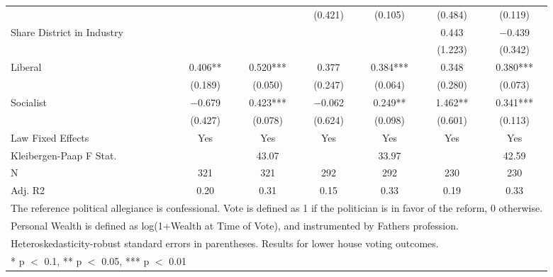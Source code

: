 \begin{table}[!h]
{\begin{tabular}[t]{lcccccc}
 &  &  & (\num{0.421}) & (\num{0.105}) & (\num{0.484}) & (\num{0.119})\\
Share District in Industry &  &  &  &  & \num{0.443} & \num{-0.439}\\
 &  &  &  &  & (\num{1.223}) & (\num{0.342})\\
Liberal & \num{0.406}** & \num{0.520}*** & \num{0.377} & \num{0.384}*** & \num{0.348} & \num{0.380}***\\
 & (\num{0.189}) & (\num{0.050}) & (\num{0.247}) & (\num{0.064}) & (\num{0.280}) & (\num{0.073})\\
Socialist & \num{-0.679} & \num{0.423}*** & \num{-0.062} & \num{0.249}** & \num{1.462}** & \num{0.341}***\\
 & (\num{0.427}) & (\num{0.078}) & (\num{0.624}) & (\num{0.098}) & (\num{0.601}) & (\num{0.113})\\
\midrule
Law Fixed Effects & Yes & Yes & Yes & Yes & Yes & Yes\\
Kleibergen-Paap F Stat. &  & 43.07 &  & 33.97 &  & 42.59\\
N & \num{321} & \num{321} & \num{292} & \num{292} & \num{230} & \num{230}\\
Adj. R2 & \num{0.20} & \num{0.31} & \num{0.15} & \num{0.33} & \num{0.19} & \num{0.33}\\
\bottomrule
\multicolumn{7}{l}{\rule{0pt}{1em}The reference political allegiance is confessional. Vote is defined as 1 if the politician is in favor of the reform, 0 otherwise.}\\
\multicolumn{7}{l}{\rule{0pt}{1em}Personal Wealth is defined as log(1+Wealth at Time of Vote), and instrumented by Fathers profession.}\\
\multicolumn{7}{l}{\rule{0pt}{1em}Heteroskedasticity-robust standard errors in parentheses. Results for lower house voting outcomes.}\\
\multicolumn{7}{l}{\rule{0pt}{1em}* p $<$ 0.1, ** p $<$ 0.05, *** p $<$ 0.01}\\
\end{tabular}}
\end{table}